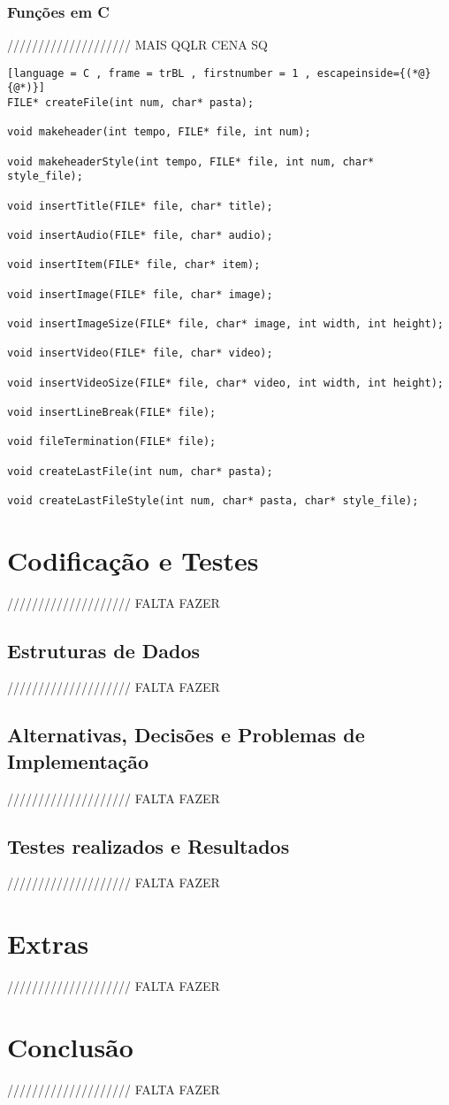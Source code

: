 \documentclass[11pt,a4paper]{report}
\begin{document}
\subsection{Funções em C}

//////////////////// MAIS QQLR CENA SQ

\begin{lstlisting}[language = C , frame = trBL , firstnumber = 1 , escapeinside={(*@}{@*)}]
FILE* createFile(int num, char* pasta);

void makeheader(int tempo, FILE* file, int num);

void makeheaderStyle(int tempo, FILE* file, int num, char* style_file);

void insertTitle(FILE* file, char* title);

void insertAudio(FILE* file, char* audio);

void insertItem(FILE* file, char* item);

void insertImage(FILE* file, char* image);

void insertImageSize(FILE* file, char* image, int width, int height);

void insertVideo(FILE* file, char* video);

void insertVideoSize(FILE* file, char* video, int width, int height);

void insertLineBreak(FILE* file);

void fileTermination(FILE* file);

void createLastFile(int num, char* pasta);

void createLastFileStyle(int num, char* pasta, char* style_file);

\end{lstlisting}

\chapter{Codificação e Testes}
\label{chap:codificacao}

//////////////////// FALTA FAZER

\section{Estruturas de Dados}

//////////////////// FALTA FAZER

\section{Alternativas, Decisões e Problemas de Implementação}

//////////////////// FALTA FAZER

\section{Testes realizados e Resultados}

//////////////////// FALTA FAZER

\chapter{Extras}
\label{chap:extras}

//////////////////// FALTA FAZER

\chapter{Conclusão}
\label{chap:concl}

//////////////////// FALTA FAZER
\end{document}
